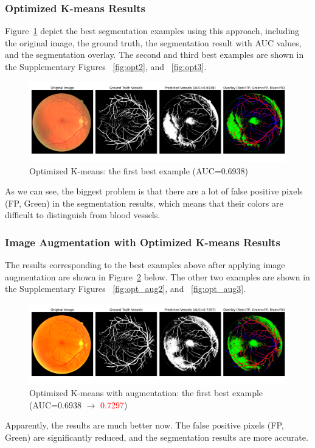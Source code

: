 \documentclass[final]{article}
\begin{document}
\subsubsection{Optimized K-means Results}
Figure~\ref{fig:opt1} depict the best segmentation examples using this approach, including the original image, the ground truth, the segmentation result with AUC values, and the segmentation overlay. The second and third best examples are shown in the Supplementary Figures ~\ref{fig:opt2}, and ~\ref{fig:opt3}. 
\begin{figure}[H]
    \centering
    \includegraphics[scale=0.25]{Figures/3 Optimized 1st.png}
    \vspace{-0.25cm}
    \caption{Optimized K-means: the first best example (AUC=0.6938)}
    \label{fig:opt1}
\end{figure}
As we can see, the biggest problem is that there are a lot of false positive pixels (FP, Green) in the segmentation results, which means that their colors are difficult to distinguish from blood vessels. 
\subsubsection{Image Augmentation with Optimized K-means Results}
The results corresponding to the best examples above after applying image augmentation are shown in Figure~\ref{fig:opt_aug1} below. The other two examples are shown in the Supplementary Figures ~\ref{fig:opt_aug2}, and ~\ref{fig:opt_aug3}.
\begin{figure}[H]
    \centering
    \includegraphics[scale=0.25]{Figures/4 Optimized 1st.png}
    \vspace{-0.25cm}
    \caption{Optimized K-means with augmentation: the first best example (AUC=0.6938 $\rightarrow$ \textcolor{red}{0.7297})}
    \label{fig:opt_aug1}
\end{figure}
Apparently, the results are much better now. The false positive pixels (FP, Green) are significantly reduced, and the segmentation results are more accurate. 
\end{document}
